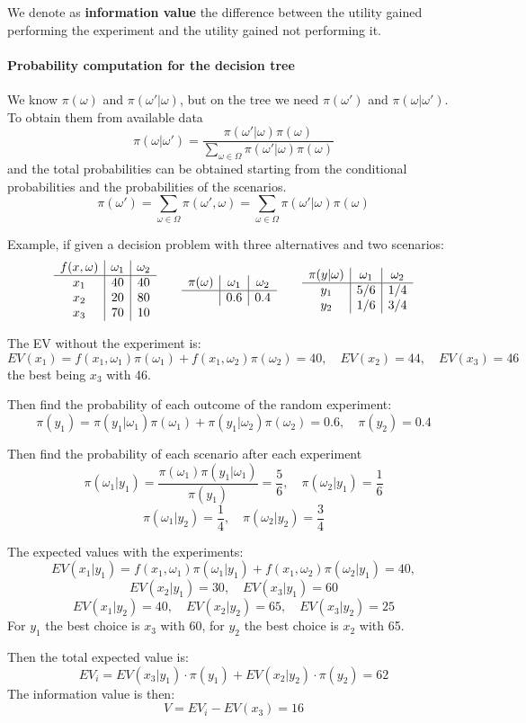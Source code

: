 We denote as \textbf{information value} the difference between the utility gained performing the experiment and the utility gained not performing it.

\paragraph{Probability computation for the decision tree} We know $\pi (\omega)$ and $\pi (\omega' | \omega)$, but on the tree we need $\pi (\omega')$ and $\pi (\omega | \omega')$. To obtain them from available data
$$ \pi(\omega | \omega') = \frac{\pi (\omega' | \omega) \pi (\omega)}{\sum_{\omega \in \Omega} \pi (\omega' | \omega) \pi (\omega)}$$
and the total probabilities can be obtained starting from the conditional probabilities and the probabilities of the scenarios. 
$$ \pi (\omega') = \sum_{\omega \in \Omega} \pi (\omega', \omega) = \sum_{\omega \in \Omega} \pi (\omega' | \omega) \pi (\omega) $$

Example, if given a decision problem with three alternatives and two scenarios:
$$
\begin{array}{c|c|c}
	f(x, \omega) & \omega_1 & \omega_2 \\
	\hline
	x_1 & 40 & 40 \\
	x_2 & 20 & 80 \\
	x_3 & 70 & 10
\end{array}
\qquad
\begin{array}{c|c|c}
	\pi(\omega) & \omega_1 & \omega_2 \\
	\hline
	& 0.6 & 0.4
\end{array}
\qquad
\begin{array}{c|c|c}
	\pi(y|\omega) & \omega_1 & \omega_2 \\
	\hline
	y_1 & 5/6 & 1/4 \\
	y_2 & 1/6 & 3/4
\end{array}
$$

The EV without the experiment is: 
$$ EV(x_1) = f(x_1, \omega_1)\pi(\omega_1) + f(x_1, \omega_2) \pi (\omega_2) = 40, \quad EV(x_2) = 44, \quad EV(x_3) = 46 $$
the best being $x_3$ with 46.

Then find the probability of each outcome of the random experiment: 
$$ \pi(y_1) = \pi(y_1|\omega_1)\pi(\omega_1) + \pi(y_1|\omega_2)\pi(\omega_2) = 0.6, \quad \pi(y_2) = 0.4 $$

Then find the probability of each scenario after each experiment
$$ \pi(\omega_1|y_1) = \frac{\pi(\omega_1) \pi(y_1|\omega_1)}{\pi(y_1)} = \frac{5}{6}, \quad \pi(\omega_2|y_1) = \frac{1}{6} $$
$$ \pi(\omega_1|y_2) = \frac{1}{4}, \quad \pi(\omega_2|y_2) = \frac{3}{4} $$


The expected values with the experiments:
$$ EV(x_1|y_1) = f(x_1, \omega_1) \pi (\omega_1 | y_1) + f(x_1, \omega_2) \pi (\omega_2 | y_1) = 40, $$
$$ EV(x_2|y_1) = 30, \quad EV(x_3|y_1) = 60 $$
$$ EV(x_1|y_2) = 40, \quad EV(x_2|y_2) = 65, \quad EV(x_3|y_2) = 25 $$
For $y_1$ the best choice is $x_3$ with 60, for $y_2$ the best choice is $x_2$ with 65.

Then the total expected value is:
$$ EV_i = EV(x_3|y_1) \cdot \pi (y_1) + EV(x_2|y_2) \cdot \pi(y_2) = 62 $$
The information value is then:
$$ V = EV_i - EV(x_3) = 16 $$
